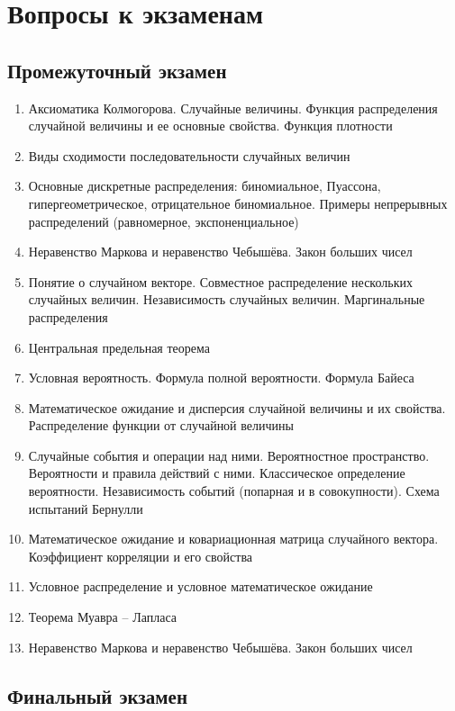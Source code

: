 \newpage
\thispagestyle{empty}
\section{Вопросы к экзаменам}

\subsection*{Промежуточный экзамен}

\begin{enumerate}
	\item Аксиоматика Колмогорова. Случайные величины. Функция распределения случайной величины и ее основные свойства. Функция плотности
	\item Виды сходимости последовательности случайных величин
	\item Основные дискретные распределения: биномиальное, Пуассона, гипергеометрическое, отрицательное биномиальное. Примеры непрерывных распределений (равномерное, экспоненциальное)
	\item Неравенство Маркова и неравенство Чебышёва. Закон больших чисел
	\item Понятие о случайном векторе. Совместное распределение нескольких случайных величин. Независимость случайных величин. Маргинальные распределения
	\item Центральная предельная теорема
	\item Условная вероятность. Формула полной вероятности. Формула Байеса
	\item Математическое ожидание и дисперсия случайной величины и их свойства. Распределение функции от случайной величины
	\item Случайные события и операции над ними. Вероятностное пространство. Вероятности и правила действий с ними. Классическое определение вероятности. Независимость событий (попарная и в совокупности). Схема испытаний Бернулли
	\item Математическое ожидание и ковариационная матрица случайного вектора. Коэффициент корреляции и его свойства
	\item Условное распределение и условное математическое ожидание
	\item Теорема Муавра – Лапласа
	\item Неравенство Маркова и неравенство Чебышёва. Закон больших чисел
\end{enumerate}

\iftoggle{excerpt}{\newpage}{}
\subsection*{Финальный экзамен}

